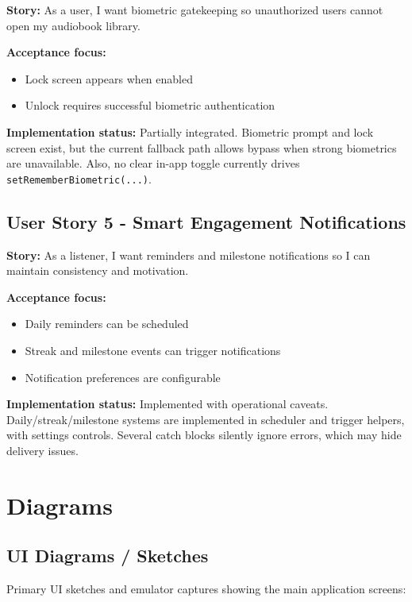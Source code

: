 \documentclass[11pt,a4paper]{article}
\begin{document}
\textbf{Story:} As a user, I want biometric gatekeeping so unauthorized users cannot open my audiobook library.

\textbf{Acceptance focus:}
\begin{itemize}[noitemsep]
    \item Lock screen appears when enabled
    \item Unlock requires successful biometric authentication
\end{itemize}

\textbf{Implementation status:} Partially integrated. Biometric prompt and lock screen exist, but the current fallback path allows bypass when strong biometrics are unavailable. Also, no clear in-app toggle currently drives \texttt{setRememberBiometric(...)}.

\subsection{User Story 5 - Smart Engagement Notifications}

\textbf{Story:} As a listener, I want reminders and milestone notifications so I can maintain consistency and motivation.

\textbf{Acceptance focus:}
\begin{itemize}[noitemsep]
    \item Daily reminders can be scheduled
    \item Streak and milestone events can trigger notifications
    \item Notification preferences are configurable
\end{itemize}

\textbf{Implementation status:} Implemented with operational caveats. Daily/streak/milestone systems are implemented in scheduler and trigger helpers, with settings controls. Several catch blocks silently ignore errors, which may hide delivery issues.

\section{Diagrams}

\subsection{UI Diagrams / Sketches}

Primary UI sketches and emulator captures showing the main application screens:
\end{document}
